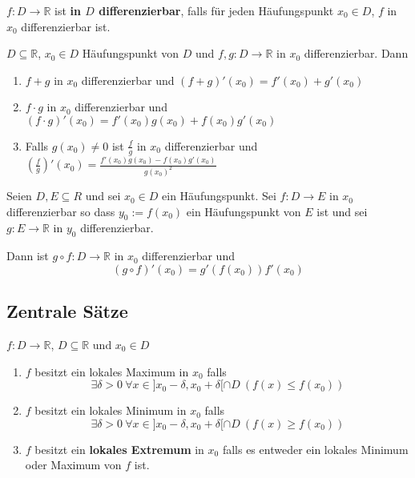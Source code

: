 \documentclass[8pt,a4paper,twocolumn,table]{extarticle}
\newcommand{\R}{\mathbb{R}}
\begin{document}
\begin{satz}{4.7}
    $f: D \to \R$ ist \textbf{in $D$ differenzierbar}, falls für jeden Häufungspunkt $x_0 \in D$, $f$ in $x_0$ differenzierbar ist.
\end{satz}

\begin{satz}{4.9}
    $D \subseteq \R$, $x_0 \in D$ Häufungspunkt von $D$ und $f,g: D \to \R$ in $x_0$ differenzierbar.
    Dann
    \begin{enumerate}
        \item $f+g$ in $x_0$ differenzierbar und $(f + g)'(x_0) = f'(x_0) + g'(x_0)$
        \item $f \cdot g$ in $x_0$ differenzierbar und $(f \cdot g)'(x_0) = f'(x_0)g(x_0) + f(x_0)g'(x_0)$
        \item Falls $g(x_0) \ne 0$ ist $\frac{f}{g}$ in $x_0$ differenzierbar und
              $\left( \frac{f}{g} \right)'(x_0) = \frac{f'(x_0)g(x_0) - f(x_0)g'(x_0)}{g(x_0)^2}$
    \end{enumerate}
\end{satz}

\begin{satz}{4.11}
    Seien $D, E \subseteq R$ und sei $x_0 \in D$ ein Häufungspunkt. Sei $f: D \to E$ in $x_0$ differenzierbar
    so dass $y_0 := f(x_0)$ ein Häufungspunkt von $E$ ist und sei $g: E \to \R$ in $y_0$ differenzierbar.

    Dann ist $g \circ f: D \to \R$ in $x_0$ differenzierbar und
    \[ (g \circ f)'(x_0) = g'(f(x_0))f'(x_0) \]
\end{satz}

\subsection{Zentrale Sätze}

\begin{definition}{4.14}
    $f: D \to \R$, $D \subseteq \R$ und $x_0 \in D$
    \begin{enumerate}
        \item $f$ besitzt ein lokales Maximum in $x_0$ falls
              \[
                  \exists \delta > 0\ \forall x \in ]x_0 - \delta, x_0 + \delta[ \cap D\ \left( f(x) \le f(x_0) \right)
              \]
        \item $f$ besitzt ein lokales Minimum in $x_0$ falls
              \[
                  \exists \delta > 0\ \forall x \in ]x_0 - \delta, x_0 + \delta[ \cap D\ \left( f(x) \ge f(x_0) \right)
              \]
        \item $f$ besitzt ein \textbf{lokales Extremum} in $x_0$ falls es entweder ein lokales Minimum oder Maximum von $f$ ist.
    \end{enumerate}
\end{definition}
\end{document}
